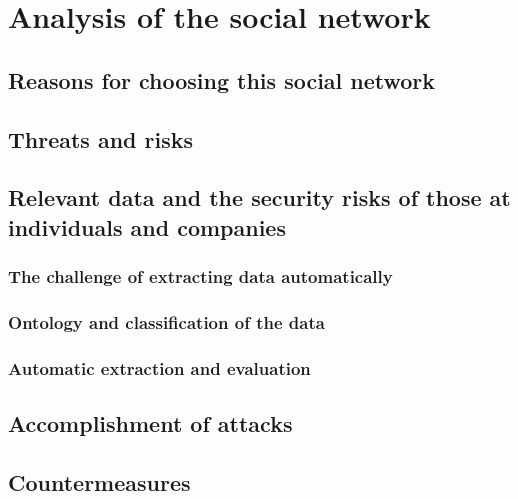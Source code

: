 \chapter{Analysis of the social network \Twitter}
\label{chapter:analysis}

\section{Reasons for choosing this social network}

\section{Threats and risks}

\section{Relevant data and the security risks of those at individuals and companies}
\subsection{The challenge of extracting data automatically}
\subsection{Ontology and classification of the data}
\subsection{Automatic extraction and evaluation}

\section{Accomplishment of attacks}

\section{Countermeasures}
